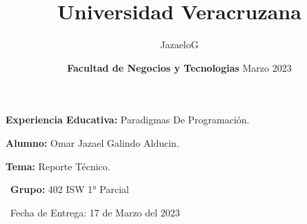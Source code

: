 \documentclass{article}
\title{\textbf{Universidad Veracruzana} }
\date{\textbf{Facultad de Negocios y Tecnologias} }
\begin{document}
\maketitle
\textsf{\Large \textbf{Experiencia Educativa:} Paradigmas De Programación.\\}
 
\maketitle
\textsf{\Large \textbf{Alumno:} Omar Jazael Galindo Alducin. \\}

\maketitle
\textsf{\Large \textbf{Tema:} Reporte Técnico. \\}

\textsf{\ \textbf{Grupo:} 402 ISW 1° Parcial \\}

\maketitle

\textsf{\ Fecha de Entrega: 17 de Marzo del 2023 \\}

\author{JazaeloG}
\date{Marzo 2023}

\newpage
\end{document}
